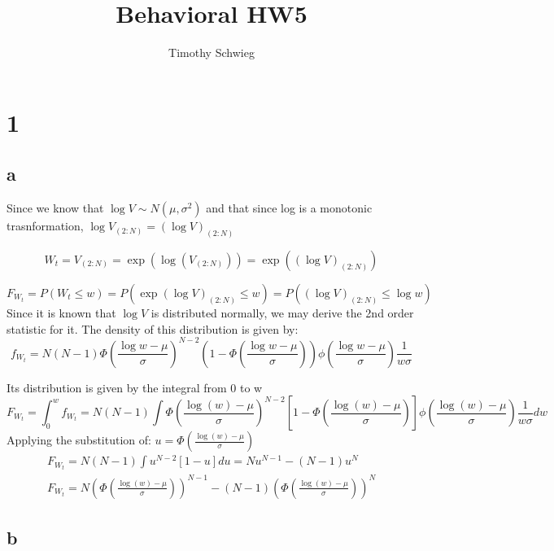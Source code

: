 \documentclass[10pt]{paper}
\title{Behavioral HW5}
\author{Timothy Schwieg}
\begin{document}
\maketitle
\section*{1}

\subsection*{a}

Since we know that $\log{V} \sim N( \mu, \sigma^2 )$ and that since log is a
monotonic trasnformation, $\log{ V_{(2:N)} } = ( \log{ V} )_{(2:N)}$

$$W_t = V_{(2:N)} = \exp( \log{ (V_{(2:N)} ) } ) = \exp( ( \log{ V
  } )_{(2:N)})$$

$$F_{W_t} = P( W_t \leq w ) = P( \exp{ ( \log{ V } )_{(2:N)}} \leq w ) = P(
(\log{V})_{(2:N)} \leq \log{w} )$$ Since it is known that $\log{V}$ is
distributed normally, we may derive the 2nd order statistic for it.
The density of this distribution is given by: 
$$f_{W_t} = N(N-1) \Phi( \frac{\log{w} - \mu}{\sigma} )^{N-2} ( 1 - \Phi(
\frac{\log{w} - \mu}{\sigma} ) ) \phi( \frac{\log{w} - \mu}{\sigma} ) \frac{1}{w \sigma} $$

Its distribution is given by the integral from 0 to w
$$F_{W_t} = \int_0^w f_{W_t} = N(N-1)\int\Phi \left( \frac{\log(w) - \mu}{\sigma}
\right)^{N-2} \left [ 1 - \Phi\left( \frac{\log(w) - \mu}{\sigma} \right)
\right] \phi \left( \frac{\log(w) - \mu}{\sigma} \right) \frac{1}{w \sigma}dw$$
Applying the substitution of: $u = \Phi\left( \frac{\log(w) - \mu}{\sigma}
\right)$
\begin{align*}
  F_{W_t} = N(N-1) \int u^{N-2}[1-u]du = Nu^{N-1} - (N-1)u^N\\
  F_{W_t} = N \left( \Phi \left( \frac{\log(w) - \mu}{\sigma} \right) \right )^{N-1} - (N-1) \left ( \Phi\left( \frac{\log(w) - \mu}{\sigma} \right) \right )^N
\end{align*}


\subsection*{b}
\end{document}
